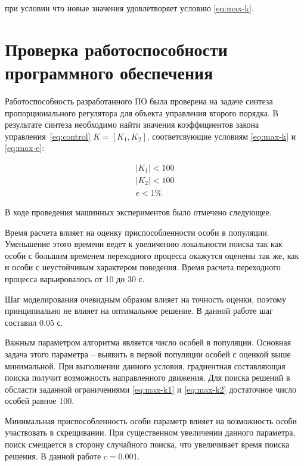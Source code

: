 \documentclass[russian,utf8,emptystyle,12pt]{eskdtext}
\begin{document}
        при условии что новые значения удовлетворяет условию \ref{eq:max-k}.
	    
	    
	\section{Проверка работоспособности программного обеспечения}    
	    
	    Работоспособность разработанного ПО была проверена на задаче синтеза пропорционального регулятора для объекта управления второго порядка. В результате синтеза необходимо найти значения коэффициентов закона управления~\ref{eq:control} $K = [ K_1, K_2 ]$, соответсвующие условиям \ref{eq:max-k} и \ref{eq:max-e}:
	    
    	\begin{eqnarray}
    		\left| K_1 \right| < 100 \label{eq:max-k1} \\
    		\left| K_2 \right| < 100 \label{eq:max-k2} \\
    		e < 1\%
    	\end{eqnarray}
    	
		В ходе проведения машинных экспериментов было отмечено следующее.
		
      	Время расчета влияет на оценку приспособленности особи в популяции. Уменьшение этого времени ведет к увеличению локальности поиска так как особи с большим временем переходного процесса окажутся оценены так же, как и особи с неустойчивым характером поведения. Время расчета переходного процесса варьировалось от 10 до 30 с.
                  
      	Шаг моделирования очевидным образом влияет на точность оценки, поэтому принципиально не влияет на оптимальное решение. В данной работе шаг составил 0.05 с.
                                   
      	Важным параметром алгоритма является число особей в популяции. Основная задача этого параметра -- выявить в первой популяции особей с оценкой выше минимальной. При выполнении данного условия, градиентная составляющая поиска получит возможность направленного движения. Для поиска решений в обсласти заданной ограничениями \ref{eq:max-k1} и \ref{eq:max-k2} достаточное число особей равное 100.
                 
      	Минимальная приспособленность особи параметр влияет на возможность особи участвовать в скрещивании. При существенном увеличении данного параметра, поиск смещается в сторону случайного поиска, что увеличивает время поиска решения. В данной работе $c = 0.001$.
\end{document}
